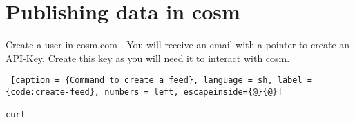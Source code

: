 \chapter{Publishing data in cosm}

Create a user in cosm.com .
You will receive an email with a pointer to create an API-Key.
Create this key as you will need it to interact with cosm.

\begin{lstlisting} [caption = {Command to create a feed}, language = sh, label = {code:create-feed}, numbers = left, escapeinside={@}{@}]

curl

\end{lstlisting}
